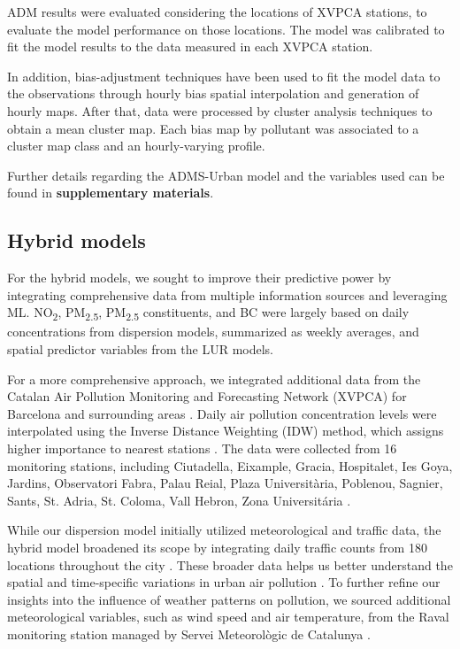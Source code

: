 \documentclass{article}
\begin{document}
ADM results were evaluated considering the locations of XVPCA stations, to evaluate the model performance on those locations. The model was calibrated to fit the model results to the data measured in each XVPCA station. 

In addition, bias-adjustment techniques have been used to fit the model data to the observations through hourly bias spatial interpolation and generation of hourly maps. After that, data were processed  by cluster analysis techniques to obtain a mean cluster map. Each bias map by pollutant was associated to a cluster map class and an hourly-varying profile. 

Further details regarding the ADMS-Urban model and the variables used can be found in \textbf{supplementary materials}.

\subsection{Hybrid models}

For the hybrid models, we sought to improve their predictive power by integrating comprehensive data from multiple information sources and leveraging ML. NO\textsubscript{2}, PM\textsubscript{2.5}, PM\textsubscript{2.5} constituents, and BC were largely based on daily concentrations from dispersion models, summarized as weekly averages, and spatial predictor variables from the LUR models. 

For a more comprehensive approach, we integrated additional data from the Catalan Air Pollution Monitoring and Forecasting Network (XVPCA) for Barcelona and surrounding areas \cite{xarxa2012}. Daily air pollution concentration levels were interpolated using the Inverse Distance Weighting (IDW) method, which assigns higher importance to nearest stations \cite{hoek2017methods}. The data were collected from 16 monitoring stations, including Ciutadella, Eixample, Gracia, Hospitalet, Ies Goya, Jardins, Observatori Fabra, Palau Reial, Plaza Universitària, Poblenou, Sagnier, Sants, St. Adria, St. Coloma, Vall Hebron, Zona Universitária \cite{xarxa2012}.

While our dispersion model initially utilized meteorological and traffic data, the hybrid model broadened its scope by integrating daily traffic counts from 180 locations throughout the city \cite{trafficbcn}. These broader data helps us better understand the spatial and time-specific variations in urban air pollution \cite{pinto2020}. To further refine our insights into the influence of weather patterns on pollution, we sourced additional meteorological variables, such as wind speed and air temperature, from the Raval monitoring station managed by Servei Meteorològic de Catalunya \cite{xema2013}.
\end{document}
